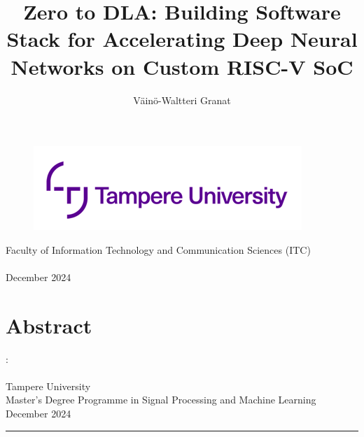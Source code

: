 \documentclass[12pt,a4paper,english
]{tunithesis}
\author{Väinö-Waltteri Granat}
\title{Zero to DLA: Building Software Stack for Accelerating Deep Neural Networks on Custom RISC-V SoC} %
\begin{document}
\makeatletter

\thispagestyle{empty}
\vspace*{-.5cm}\noindent

\begin{figure}
    \vspace{-1.3cm}
    \advance\leftskip-2.5cm
    \noindent\includegraphics{img/tunilogo.png}
\end{figure}
 
\vspace{2.5cm}
\begin{flushright}
\noindent\textsf{\LARGE{\@author}}

\noindent\vspace{0.5cm}

\noindent\Huge{\textsf{\textbf{\textcolor{tunipurple}{\@title}}}}
\end{flushright}
\vspace{10.7cm} %

\begin{flushright}  
    \begin{spacing}{1.0}
      \textsf{Faculty of Information Technology and Communication Sciences (ITC)\\
      \@thesistype\\
      December 2024}
    \end{spacing}
\end{flushright}

\if@twoside
\clearpage
\fi




\chapter*{Abstract}

\begin{spacing}{1.0}
\noindent \@author: \@title\\
\@thesistype\\
Tampere University\\
Master’s Degree Programme in Signal Processing and Machine Learning\\
December 2024
\end{spacing}
\noindent\rule{12cm}{0.4pt}
\end{document}
